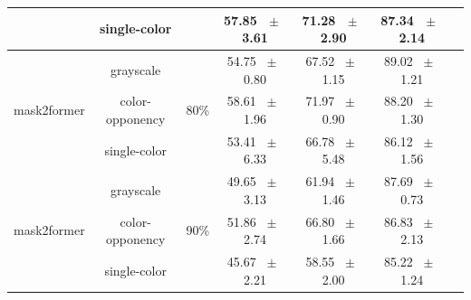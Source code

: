 \begin{table}[h]
\begin{tabular}{@{}lccc ccc@{}}
    & single-color & & 57.85 ~$\pm$~ 3.61 & 71.28 ~$\pm$~ 2.90 & 87.34 ~$\pm$~ 2.14 \\
    \midrule
    \multirow{3}{*}{mask2former} & grayscale & \multirow{3}{*}{80\%} & 54.75 ~$\pm$~ 0.80 & 67.52 ~$\pm$~ 1.15 & 89.02 ~$\pm$~ 1.21 \\
    & color-opponency & & 58.61 ~$\pm$~ 1.96 & 71.97 ~$\pm$~ 0.90 & 88.20 ~$\pm$~ 1.30 \\
    & single-color & & 53.41 ~$\pm$~ 6.33 & 66.78 ~$\pm$~ 5.48 & 86.12 ~$\pm$~ 1.56 \\
    \midrule
    \multirow{3}{*}{mask2former} & grayscale & \multirow{3}{*}{90\%} & 49.65 ~$\pm$~ 3.13 & 61.94 ~$\pm$~ 1.46 & 87.69 ~$\pm$~ 0.73 \\
    & color-opponency & & 51.86 ~$\pm$~ 2.74 & 66.80 ~$\pm$~ 1.66 & 86.83 ~$\pm$~ 2.13 \\
    & single-color & & 45.67 ~$\pm$~ 2.21 & 58.55 ~$\pm$~ 2.00 & 85.22 ~$\pm$~ 1.24 \\
    \midrule
    \bottomrule
  \end{tabular}
  \label{tab:sparse_mask2former_acdc_fog}
\end{table}